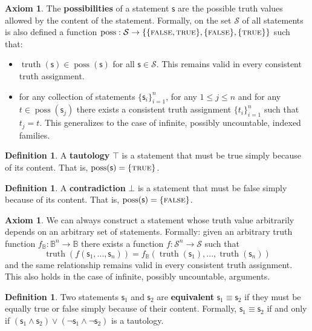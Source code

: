 \documentclass[letterpaper]{article}
\theoremstyle{plain}%
\theoremstyle{definition}
\newtheorem{defn}[thrm]{Definition}
\newtheorem{axiom}[thrm]{Axiom}
\theoremstyle{remark}
\DeclareMathOperator{\truth}{truth}
\DeclareMathOperator{\possFn}{poss}
\def\TRUE{\textsc{true}}
\def\FALSE{\textsc{false}}
\def\tautology{\top}
\def\contradiction{\bot}
\def\AND{\wedge}
\def\OR{\vee}
\def\NOT{\neg}
\newcommand{\stmt}[1][s] {\mathsf{#1}}
\begin{document}
\begin{axiom}\label{ax_possibilities}
	The \textbf{possibilities} of a statement $\stmt$ are the possible truth values allowed by the content of the statement. Formally, on the set $\mathcal{S}$ of all statements is also defined a function $\possFn: \mathcal{S} \to \{\{\FALSE, \TRUE\},\{\FALSE\},\{\TRUE\}\}$ such that:
	\begin{itemize}
		\item $\truth(\stmt) \in \possFn(\stmt)$ for all $\stmt \in \mathcal{S}$. This remains valid in every consistent truth assignment.
		\item for any collection of statements $\{\stmt_i\}^n_{i=1}$, for any $1 \leq j \leq n$ and for any $t \in \possFn(\stmt_j)$ there exists a consistent truth assignment $\{t_i\}^n_{i=1}$ such that $t_j = t$. This generalizes to the case of infinite, possibly uncountable, indexed families.
	\end{itemize}
\end{axiom}

\begin{defn}
	A \textbf{tautology} $\tautology$ is a statement that must be true simply because of its content. That is, $\possFn(\stmt) = \{\TRUE\}$.
\end{defn}

\begin{defn}
	A \textbf{contradiction} $\contradiction$ is a statement that must be false simply because of its content. That is, $\possFn(\stmt) = \{\FALSE\}$.
\end{defn}


\begin{axiom}\label{ax_functions_of_statement}
	We can always construct a statement whose truth value arbitrarily depends on an arbitrary set of statements. Formally: given an arbitrary truth function $f_{\mathbb{B}} : \mathbb{B}^n \to \mathbb{B}$ there exists a function $f : \mathcal{S}^n \to \mathcal{S}$ such that
	$$\truth(f(\stmt_1, ..., \stmt_n)) = f_{\mathbb{B}}(\truth(\stmt_1), ..., \truth(\stmt_n))$$
	and the same relationship remains valid in every consistent truth assignment. This also holds in the case of infinite, possibly uncountable, arguments.
\end{axiom}

\begin{defn}
	Two statements $\stmt_1$ and $\stmt_2$ are \textbf{equivalent} $\stmt_1 \equiv \stmt_2$ if they must be equally true or false simply because of their content. Formally, $\stmt_1 \equiv \stmt_2$ if and only if $(\stmt_1 \AND \stmt_2) \OR (\NOT\stmt_1 \AND \NOT\stmt_2)$ is a tautology.
\end{defn}
\end{document}

